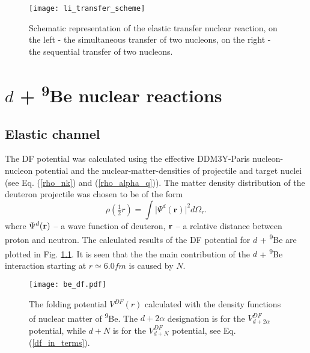 \documentclass[
12pt, %
oneside, %
english, %
doublespacing, %
doublespacing, %
toctotoc, %
parskip, %
headsepline, %
]{MastersDoctoralThesis} %
\newcommand{\be}{\textsuperscript{9}Be\xspace}
\begin{document}
\begin{figure}
\centering
\texttt{[image: li\_transfer\_scheme]}
\decoRule
\caption{    Schematic representation of the elastic transfer nuclear reaction, on the left - the simultaneous transfer of two nucleons, on the right - the sequential transfer of two nucleons.
}
\label{li_transfer_scheme}
\end{figure}

\chapter{$d$ + \be nuclear reactions }
\section{Elastic channel}
The DF potential was calculated using the effective DDM3Y-Paris nucleon-nucleon potential \citep{anantaraman1983effective} and the nuclear-matter-densities of projectile and target nuclei (see Eq. (\ref{rho_nk}) and (\ref{rho_alpha_q})). 
The matter density distribution of the deuteron projectile was chosen to be of the form
\begin{equation}
\rho\left( \tfrac{1}{2}r \right) =\int \vert \Psi^d (\textbf{r}) \vert ^2 d \Omega_r.
\end{equation}
where $\Psi^d({\bf r})$ -- a wave function of deuteron, ${\bf r}$ -- a relative distance between proton and neutron. 
The calculated results of the DF potential for $d$ + \be are plotted in Fig. \ref{dbe_df}.  It is seen that the the main contribution of the $d$ + \be interaction  starting at $r\simeq6.0 fm$ is caused by $N$.

\begin{figure}[bp]
\centering
\texttt{[image: be\_df.pdf]}
\decoRule
\caption{ \label{dbe_df}  The folding potential $V^{DF}(r)$ calculated with the density functions of nuclear matter of \be. The $d+ 2 \alpha$ designation is for the $V_{d+2\alpha}^{DF}$ potential, while $d + N$ is for the  $V_{d + N}^{DF}$ potential,  see Eq.  (\ref{df_in_terms}).}
\end{figure}
\end{document}
